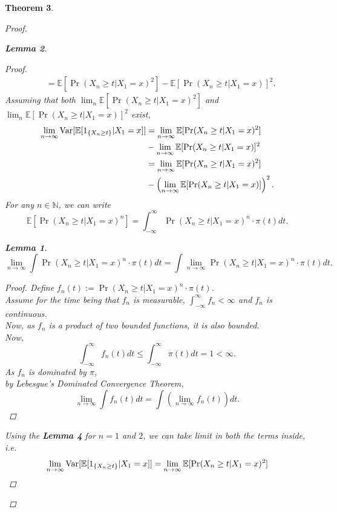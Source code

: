 \documentclass{article}
\newtheorem{theorem}{Theorem}[section]
\newtheorem{lemma}[theorem]{Lemma}
\begin{document}
\begin{theorem}
\begin{proof}
\begin{lemma}
\begin{proof}
\begin{align*}
						&= \mathbb{E}[\Pr(X_{n} \geq t | X_{1} = x)^2] - \mathbb{E}[\Pr(X_{n} \geq t | X_{1} = x)]^2.
					\end{align*}
					Assuming that both $\lim_n \mathbb{E}[\Pr(X_{n} \geq t | X_{1} = x)^2]$ and  $\lim_n \mathbb{E}[\Pr(X_{n} \geq t | X_{1} = x)]^2$ exist,
					\begin{align*}
						\lim_{n \rightarrow \infty} \text{Var}[\mathbb{E}[1_{\{X_{n} \geq t\}}|X_1=x]] &= \lim_{n \rightarrow \infty} \mathbb{E}[\Pr(X_{n} \geq t | X_{1} = x)^2]\\
						&- \lim_{n \rightarrow \infty} \mathbb{E}[\Pr(X_{n} \geq t | X_{1} = x)]^2\\
						&= \lim_{n \rightarrow \infty} \mathbb{E}[\Pr(X_{n} \geq t | X_{1} = x)^2]\\
						&- \left(\lim_{n \rightarrow \infty} \mathbb{E}[\Pr(X_{n} \geq t | X_{1} = x)]\right)^2.\\
					\end{align*}
					For any $n \in \mathbb{N}$, we can write
					$$\mathbb{E}[\Pr(X_{n} \geq t | X_{1} = x)^n] = \int_{-\infty}^{\infty} \Pr(X_{n} \geq t | X_{1} = x)^n \cdot \pi(t)dt.$$
					\begin{lemma}
						$$\lim_{n \rightarrow \infty} \int \Pr(X_{n} \geq t | X_{1} = x)^n \cdot \pi(t) dt = \int \lim_{n \rightarrow \infty}\Pr(X_{n} \geq t | X_{1} = x)^n \cdot \pi(t)dt.$$
						\begin{proof}
							Define $f_n(t) := \Pr(X_{n} \geq t | X_{1} = x)^n \cdot \pi(t)$. \\
							Assume for the time being that $f_n$ is measurable, $\int_{-\infty}^{\infty} f_n < \infty$ and $f_n$ is continuous.\\
							Now, as $f_n$ is a product of two bounded functions, it is also bounded. \\
							Now,
							$$\int_{-\infty}^{\infty} f_n(t)dt \leq \int_{-\infty}^{\infty} \pi(t)dt = 1 < \infty.$$
							As $f_n$ is dominated by $\pi$, \\
							by Lebesgue's Dominated Convergence Theorem,
							$$\lim_{n \rightarrow \infty} \int f_n(t) dt = \int \left(\lim_{n \rightarrow \infty} f_n(t)\right) dt.$$
						\end{proof}
					\end{lemma}
					Using the \textbf{Lemma 4} for $n = 1$ and $2$, we can take limit in both the terms inside, i.e.
					\begin{align*}
						\lim_{n \rightarrow \infty} \Var[\mathbb{E}[1_{\{X_{n} \geq t\}}|X_1=x]] &= \lim_{n \rightarrow \infty} \mathbb{E}[\Pr(X_{n} \geq t | X_{1} = x)^2]\\

\end{align*}
\end{proof}
\end{lemma}
\end{proof}
\end{theorem}
\end{document}
